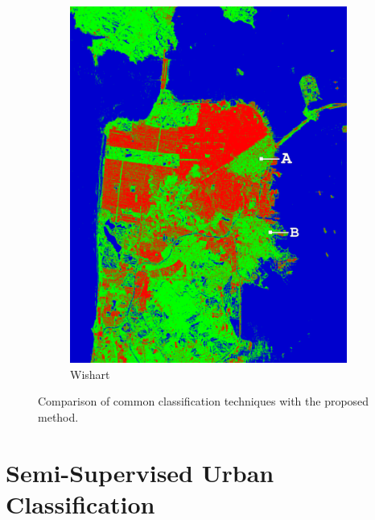 \documentclass[12pt, a4paper]{article}
\begin{document}
\begin{figure}
\begin{subfigure}[t]{0.15\textwidth}
		\includegraphics[trim={150px 80px 40px 50px},clip,width=\columnwidth]{Figures/ALOS2_SF_3Class/wishart_supervised_class_1x1} 
		\caption{Wishart}
		\label{fig:al2_wish_1}
	\end{subfigure}
	\caption{Comparison of common classification techniques with the proposed method.}
	\label{fig:comparison_al2}
\end{figure}



\section{Semi-Supervised Urban Classification }
\end{document}
